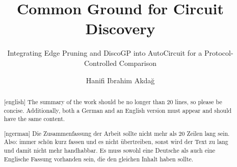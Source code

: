 \documentclass[
	english,%
	accentcolor=9c,%
	ruledheaders=section,%
	class=report,%
	thesis={type=master},%
	fontsize=11pt,%
	parskip=half-,%
	custommargins=true,%
	marginpar=false,%
]{tudapub}
\title{Common Ground for Circuit Discovery}
\subtitle{Integrating Edge Pruning and DiscoGP into AutoCircuit for a Protocol-Controlled Comparison}
\author[vorname nachname]{Hanifi Ibrahim Akdağ}%
\institute{Ubiquitous Knowledge Processing Lab}
\begin{document}
\maketitle
\affidavit

\begin{abstract}[english]
	The summary of the work should be no longer than 20 lines, so please be concise. Additionally, both a German and an English version must appear and should have the same content.
\end{abstract}

\begin{abstract}[ngerman]
	Die Zusammenfassung der Arbeit sollte nicht mehr als 20 Zeilen lang sein. Also: immer schön kurz fassen und es nicht übertreiben, sonst wird der Text zu lang und damit nicht mehr handhabbar. Es muss sowohl eine Deutsche als auch eine Englische Fassung vorhanden sein, die den gleichen Inhalt haben sollte.
\end{abstract}

\tableofcontents













\end{document}
